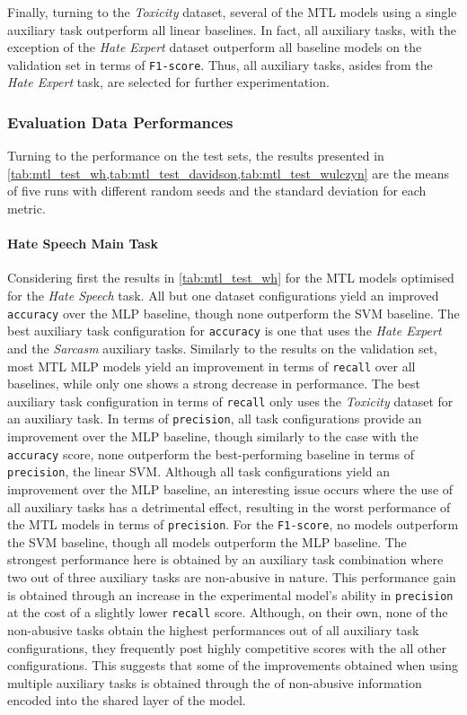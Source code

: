 Finally, turning to the \textit{Toxicity} dataset, several of the MTL models using a single auxiliary task outperform all linear baselines.
In fact, all auxiliary tasks, with the exception of the \textit{Hate Expert} dataset outperform all baseline models on the validation set in terms of \texttt{F1-score}.
Thus, all auxiliary tasks, asides from the \textit{Hate Expert} task, are selected for further experimentation.\vspace{5mm}

\subsubsection{Evaluation Data Performances}
Turning to the performance on the test sets, the results presented in \cref{tab:mtl_test_wh,tab:mtl_test_davidson,tab:mtl_test_wulczyn} are the means of five runs with different random seeds and the standard deviation for each metric.

\paragraph{Hate Speech Main Task}
Considering first the results in \cref{tab:mtl_test_wh} for the MTL models optimised for the \textit{Hate Speech} task.
All but one dataset configurations yield an improved \texttt{accuracy} over the MLP baseline, though none outperform the SVM baseline.
The best auxiliary task configuration for \texttt{accuracy} is one that uses the \textit{Hate Expert} and the \textit{Sarcasm} auxiliary tasks.
Similarly to the results on the validation set, most MTL MLP models yield an improvement in terms of \texttt{recall} over all baselines, while only one shows a strong decrease in performance.
The best auxiliary task configuration in terms of \texttt{recall} only uses the \textit{Toxicity} dataset for an auxiliary task.
In terms of \texttt{precision}, all task configurations provide an improvement over the MLP baseline, though similarly to the case with the \texttt{accuracy} score, none outperform the best-performing baseline in terms of \texttt{precision}, the linear SVM.
Although all task configurations yield an improvement over the MLP baseline, an interesting issue occurs where the use of all auxiliary tasks has a detrimental effect, resulting in the worst performance of the MTL models in terms of \texttt{precision}.
For the \texttt{F1-score}, no models outperform the SVM baseline, though all models outperform the MLP baseline.
The strongest performance here is obtained by an auxiliary task combination where two out of three auxiliary tasks are non-abusive in nature.
This performance gain is obtained through an increase in the experimental model's ability in \texttt{precision} at the cost of a slightly lower \texttt{recall} score.
Although, on their own, none of the non-abusive tasks obtain the highest performances out of all auxiliary task configurations, they frequently post highly competitive scores with the all other configurations.
This suggests that some of the improvements obtained when using multiple auxiliary tasks is obtained through the  of non-abusive information encoded into the shared layer of the model.


